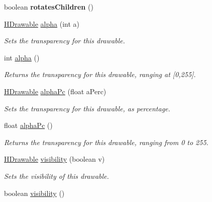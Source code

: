\begin{DoxyCompactItemize}
\item 
\hypertarget{classhype_1_1core_1_1drawable_1_1_h_drawable_abb9954d239c0f8aec7fdaebe7c6ba02f}{boolean {\bfseries rotates\-Children} ()}\label{classhype_1_1core_1_1drawable_1_1_h_drawable_abb9954d239c0f8aec7fdaebe7c6ba02f}

\item 
\hyperlink{classhype_1_1core_1_1drawable_1_1_h_drawable}{H\-Drawable} \hyperlink{classhype_1_1core_1_1drawable_1_1_h_drawable_ae0711e3bde7279c84b0282f928bbe699}{alpha} (int a)
\begin{DoxyCompactList}\small\item\em Sets the transparency for this drawable. \end{DoxyCompactList}\item 
int \hyperlink{classhype_1_1core_1_1drawable_1_1_h_drawable_ab3b43c250064df54b92a6939bddd0b43}{alpha} ()
\begin{DoxyCompactList}\small\item\em Returns the transparency for this drawable, ranging at {\ttfamily \mbox{[}0,255\mbox{]}}. \end{DoxyCompactList}\item 
\hyperlink{classhype_1_1core_1_1drawable_1_1_h_drawable}{H\-Drawable} \hyperlink{classhype_1_1core_1_1drawable_1_1_h_drawable_ab71ad420ba6d4a5eb981296684033d74}{alpha\-Pc} (float a\-Perc)
\begin{DoxyCompactList}\small\item\em Sets the transparency for this drawable, as percentage. \end{DoxyCompactList}\item 
float \hyperlink{classhype_1_1core_1_1drawable_1_1_h_drawable_a3be1ca0802560e21622875604b0da0ff}{alpha\-Pc} ()
\begin{DoxyCompactList}\small\item\em Returns the transparency for this drawable, ranging from 0 to 255. \end{DoxyCompactList}\item 
\hyperlink{classhype_1_1core_1_1drawable_1_1_h_drawable}{H\-Drawable} \hyperlink{classhype_1_1core_1_1drawable_1_1_h_drawable_abad4b596d0577a3655ff0827aac62ee2}{visibility} (boolean v)
\begin{DoxyCompactList}\small\item\em Sets the visibility of this drawable. \end{DoxyCompactList}\item 
boolean \hyperlink{classhype_1_1core_1_1drawable_1_1_h_drawable_af123e1795e471825ca608a2b90e88163}{visibility} ()

\end{DoxyCompactItemize}
